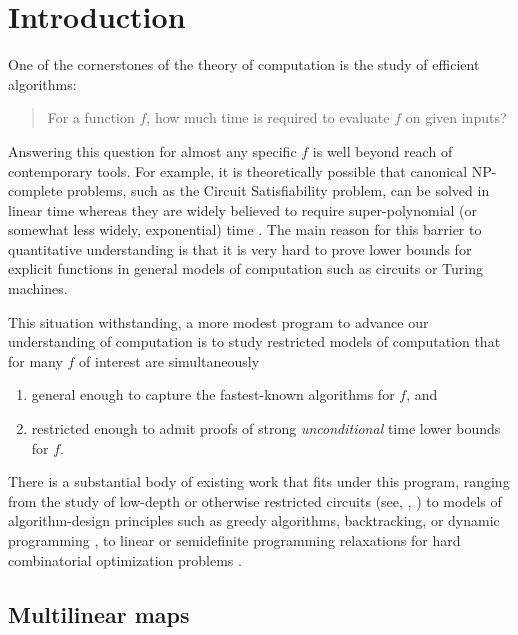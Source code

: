 
%
%
%

\section{Introduction}

\noindent
One of the cornerstones of the theory of computation is the study of efficient
algorithms:
\begin{quote}
For a function $f$, how much time is required to evaluate $f$ on given inputs?
\end{quote}
Answering this question for almost any specific $f$ is well beyond
reach of contemporary tools. For example, it is theoretically possible
that canonical NP-complete problems,
such as the Circuit Satisfiability problem, can be solved in linear
time whereas they are widely believed to require super-polynomial
(or somewhat less widely, exponential) time \cite{Gasarch2012,Impagliazzo2001,Impagliazzo2001b}.
The main reason for this barrier to quantitative understanding is that it is
very hard to prove lower bounds for explicit functions in general models
of computation such as circuits or Turing machines.

This situation withstanding, a more modest program to advance our
understanding of computation is to study restricted models of computation
that for many $f$ of interest are simultaneously
\begin{enumerate}%
\item
general enough to capture the fastest-known algorithms for
$f$, and
\item
restricted enough to admit proofs of strong \emph{unconditional} time
lower bounds for $f$.
\end{enumerate}
There is a substantial body of existing work that fits under this program,
ranging from the study of low-depth or otherwise restricted circuits
%
(see, \eg, \cite[Ch. 14]{AroraB2009})  %
to models of algorithm-design principles such as greedy algorithms,
backtracking, or dynamic programming
\cite{AlekhnovichBBIMP2011,DavisI2009}, to linear or semidefinite
programming relaxations for hard combinatorial optimization problems
\cite{LeeRS2015}.

\subsection{Multilinear maps}

